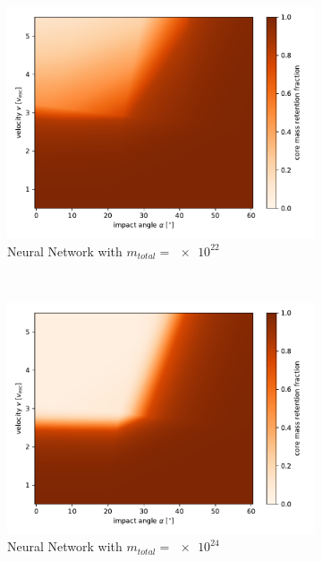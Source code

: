 \begin{figure}
\begin{subfigure}[t]{0.5\textwidth}
	\includegraphics[width=\linewidth]{images/plots/mass_nn1.pdf}
	\caption{Neural Network  with $m_{total}=\num{e22}$}
	\label{fig:mass_nn1}
\end{subfigure}%
~ 
\begin{subfigure}[t]{0.5\textwidth}
	\centering
	\includegraphics[width=\linewidth]{images/plots/mass_nn2.pdf}
	\caption{Neural Network  with $m_{total}=\num{e24}$}
	\label{fig:mass_nn2}
\end{subfigure}
	\caption{}
	\label{fig:mass_results}
\end{figure}
